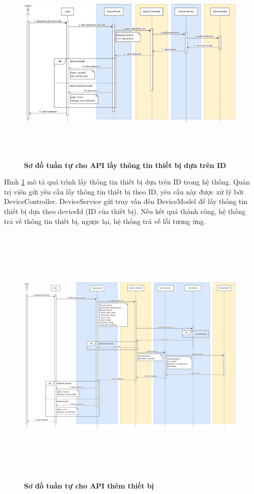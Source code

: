 \begin{figure}[H]
  \centering
  \includegraphics[width=16cm,height=10cm]{Images/sequence_api/getDeviceById.png}
  \caption[Sơ đồ tuần tự cho API lấy thông tin thiết bị dựa trên ID]{\bfseries \fontsize{12pt}{0pt}
  \selectfont Sơ đồ tuần tự cho API lấy thông tin thiết bị dựa trên ID }
  \label{api_getDeviceById} %
\end{figure}
Hình \ref{api_getDeviceById} mô tả quá trình lấy thông tin thiết bị dựa trên ID trong hệ thống. Quản trị viên gửi yêu cầu lấy thông tin thiết bị theo ID, 
yêu cầu này được xử lý bởi DeviceController. DeviceService gửi truy vấn đến DeviceModel để lấy thông tin thiết bị dựa theo deviceId (ID của thiết bị). 
Nếu kết quả thành công, hệ thống trả về thông tin thiết bị, ngược lại, hệ thống trả về lỗi tương ứng.
\begin{figure}[H]
  \centering
  \includegraphics[width=16cm,height=13cm]{Images/sequence_api/addDevice.png}
  \caption[Sơ đồ tuần tự cho API thêm thiết bị]{\bfseries \fontsize{12pt}{0pt}
  \selectfont Sơ đồ tuần tự cho API thêm thiết bị }
  \label{api_addDevice} %
\end{figure}
